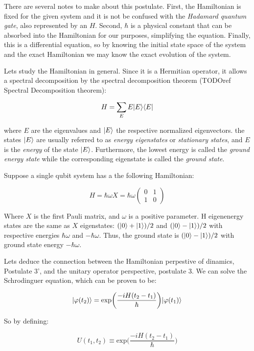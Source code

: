 There are several notes to make about this postulate. First, the Hamiltonian is fixed for the given system and it is not be confused with the \emph{Hadamard quantum gate}, also represented by an $H$. Second, $\hbar$ is a physical constant that can be absorbed into the Hamiltonian for our purposes, simplifying the equation. Finally, this is a differential equation, so by knowing the initial state space of the system and the exact Hamiltonian we may know the exact evolution of the system.

Lets study the Hamiltonian in general. Since it is a Hermitian operator, it allows a spectral decomposition by the spectral decomposition theorem (TODOref Spectral Decomposition theorem):

$$ H = \sum_E E |E\rangle\langle E| $$

where $E$ are the eigenvalues and $|E\rangle$ the respective normalized eigenvectors. the states $|E\rangle$ are usually referred to as \emph{energy eigenstates} or \emph{stationary states}, and $E$ is the \emph{energy} of the state $|E\rangle$. Furthermore, the lowest energy is called the \emph{ground energy state} while the corresponding eigenstate is called the \emph{ground state}.

\begin{exampleth} Suppose a single qubit system has a the following Hamiltonian:
	
	$$ H = \hbar \omega X = \hbar \omega
	\begin{pmatrix}
		0 & 1 \\
		1 & 0 
	\end{pmatrix}
	$$
	
	Where $X$ is the first Pauli matrix, and $\omega$ is a positive parameter. H eigenenergy states are the same as $X$ eigenstates: $(|0\rangle + |1\rangle)/2$ and $(|0\rangle - |1\rangle)/2$ with respective energies $\hbar\omega$ and $-\hbar\omega$. Thus, the ground state is $(|0\rangle - |1\rangle)/2$ with ground state energy $-\hbar\omega$.
\end{exampleth}

Lets deduce the connection between the Hamiltonian perpestive of dinamics, Postulate 3', and the unitary operator perspective, postulate 3. We can solve the Schrodinguer equation, which can be proven to be:

$$ |\varphi(t_2)\rangle = \text{exp} \bigg(  \frac{-iH(t_2-t_1)}{\hbar} \bigg) |\varphi(t_1)\rangle $$

So by defining:

$$ U(t_1, t_2) \equiv \text{exp} \bigg(  \frac{-iH(t_2-t_1)}{\hbar} \bigg) $$

